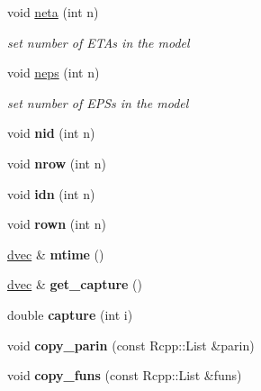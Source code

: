 \begin{DoxyCompactItemize}
void \hyperlink{classodeproblem_a96c6c7170fe10ea41cd889e5ff0a4dcd}{neta} (int n)
\begin{DoxyCompactList}\small\item\em set number of {\ttfamily E\+T\+As} in the model \end{DoxyCompactList}\item 
\mbox{\label{classodeproblem_a99d73608dddbb8fdaa58592bda59d45a}} 
void \hyperlink{classodeproblem_a99d73608dddbb8fdaa58592bda59d45a}{neps} (int n)
\begin{DoxyCompactList}\small\item\em set number of {\ttfamily E\+P\+Ss} in the model \end{DoxyCompactList}\item 
\mbox{\label{classodeproblem_ad7800dc80fb646deea76e440af5fa6c6}} 
void {\bfseries nid} (int n)
\item 
\mbox{\label{classodeproblem_ae02303871f68a48c256ccc7ce2c71981}} 
void {\bfseries nrow} (int n)
\item 
\mbox{\label{classodeproblem_ada58c0594a72e21a3aa3c56876599df4}} 
void {\bfseries idn} (int n)
\item 
\mbox{\label{classodeproblem_ad385d5c62a5a215b537cbd88a98e4d28}} 
void {\bfseries rown} (int n)
\item 
\mbox{\label{classodeproblem_a5ae9d2f4c7b37407ddeddfdbcae7590c}} 
\hyperlink{mrgsolv_8h_ac6aa1a2351760492203846ae74778c05}{dvec} \& {\bfseries mtime} ()
\item 
\mbox{\label{classodeproblem_a54adaa665b551ba6ffe835e2d2ddf48f}} 
\hyperlink{mrgsolv_8h_ac6aa1a2351760492203846ae74778c05}{dvec} \& {\bfseries get\+\_\+capture} ()
\item 
\mbox{\label{classodeproblem_a9a053ea59d585643d52825c31e9ed203}} 
double {\bfseries capture} (int i)
\item 
\mbox{\label{classodeproblem_a0058d8ce64adbefd960571d19de47ca4}} 
void {\bfseries copy\+\_\+parin} (const Rcpp\+::\+List \&parin)
\item 
\mbox{\label{classodeproblem_a44cc384c4d3c6e9c95dbafdfc92ba7b6}} 
void {\bfseries copy\+\_\+funs} (const Rcpp\+::\+List \&funs)
\end{DoxyCompactItemize}
